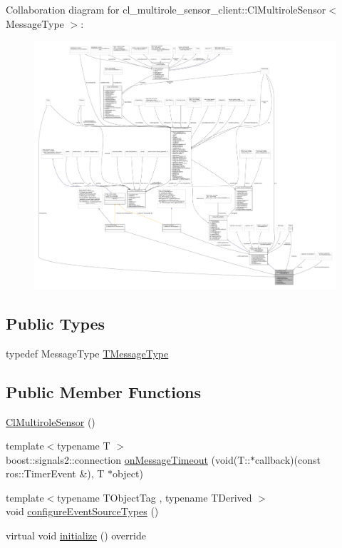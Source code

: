 Collaboration diagram for cl\+\_\+multirole\+\_\+sensor\+\_\+client\+:\+:Cl\+Multirole\+Sensor$<$ Message\+Type $>$\+:
\nopagebreak
\begin{figure}[H]
\begin{center}
\leavevmode
\includegraphics[width=350pt]{classcl__multirole__sensor__client_1_1ClMultiroleSensor__coll__graph}
\end{center}
\end{figure}
\subsection*{Public Types}
\begin{DoxyCompactItemize}
\item 
typedef Message\+Type \hyperlink{classcl__multirole__sensor__client_1_1ClMultiroleSensor_af8a43717b7334dec5c2857107203794f}{T\+Message\+Type}
\end{DoxyCompactItemize}
\subsection*{Public Member Functions}
\begin{DoxyCompactItemize}
\item 
\hyperlink{classcl__multirole__sensor__client_1_1ClMultiroleSensor_a14f088508b9b4a69e7ff595c16854c7a}{Cl\+Multirole\+Sensor} ()
\item 
{\footnotesize template$<$typename T $>$ }\\boost\+::signals2\+::connection \hyperlink{classcl__multirole__sensor__client_1_1ClMultiroleSensor_ae97272ce47cc323516890110393a6959}{on\+Message\+Timeout} (void(T\+::$\ast$callback)(const ros\+::\+Timer\+Event \&), T $\ast$object)
\item 
{\footnotesize template$<$typename T\+Object\+Tag , typename T\+Derived $>$ }\\void \hyperlink{classcl__multirole__sensor__client_1_1ClMultiroleSensor_a73d4646fbc4e83fee415aa6b5913f4e9}{configure\+Event\+Source\+Types} ()
\item 
virtual void \hyperlink{classcl__multirole__sensor__client_1_1ClMultiroleSensor_ac209b8269b48a807a25b553f392bac0b}{initialize} () override
\end{DoxyCompactItemize}
